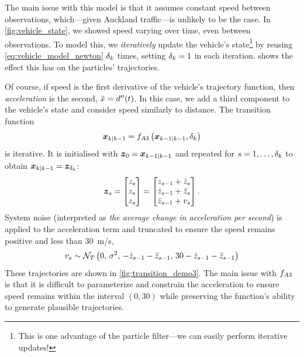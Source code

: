 The main issue with this model is that it assumes constant speed between observations, which---given Auckland traffic---is unlikely to be the case. In \cref{fig:vehicle_state}, we showed speed varying over time, even between observations. To model this, we \emph{iteratively} update the vehicle's state\footnote{This is one advantage of the particle filter---we can easily perform iterative updates!} by reusing \cref{eq:vehicle_model_newton} $\delta_k$ times, setting $\delta_k=1$ in each iteration.  shows the effect this has on the particles' trajectories.


Of course, if speed is the first derivative of the vehicle's trajectory function, then \emph{acceleration} is the second, $\ddot x = d''(t)$. In this case, we add a third component to the vehicle's state and consider speed similarly to distance. The transition function
\begin{equation}
\label{eq:vehicle_model_newton_accel}
\boldsymbol x_{k|k-1} = f_{A3}\left(\boldsymbol x_{k-1|k-1},\delta_k\right)
\end{equation}
is iterative. It is initialised with $\boldsymbol z_0 = \boldsymbol x_{k-1|k-1}$ and repeated for $s = 1, \ldots, \delta_k$ to obtain $\boldsymbol x_{k|k-1} = \boldsymbol z_{\delta_k}$:
\begin{equation}
\label{eq:vehicle_model_newton_accel_iter}
\boldsymbol z_s =
\begin{bmatrix}
z_s \\ z_s \\ z_s
\end{bmatrix} =
\begin{bmatrix}
z_{s-1} + \dot z_s \\
\dot z_{s-1} + \ddot z_s \\
\ddot z_{s-1} + v_s
\end{bmatrix}.
\end{equation}
System noise (interpreted as \emph{the average change in acceleration per second}) is applied to the acceleration term and truncated to ensure the speed remains positive and less than 30~m/s,
\begin{equation}
\label{eq:vehicle_model_accel_dist}
v_s \sim \mathcal{N}_T\left(0,\, \sigma^2,\, -\dot z_{s-1} - \ddot z_{s-1},\, 30 - \dot z_{s-1} - \ddot z_{s-1}\right)
\end{equation}
These trajectories are shown in \cref{fig:transition_demo3}. The main issue with $f_{A3}$ is that it is difficult to parameterize and constrain the acceleration to ensure speed remains within the interval $(0,30)$ while preserving the function's ability to generate plausible trajectories.



